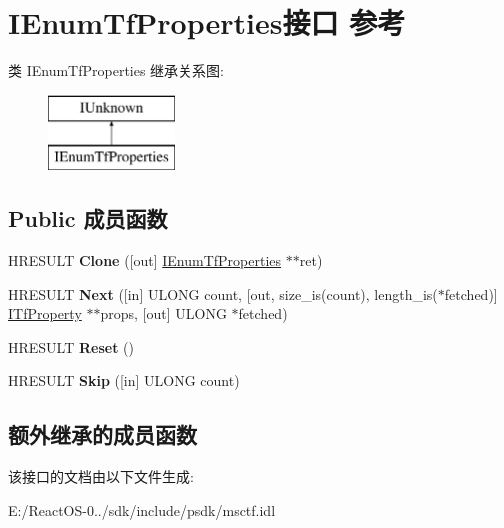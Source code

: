 \hypertarget{interface_i_enum_tf_properties}{}\section{I\+Enum\+Tf\+Properties接口 参考}
\label{interface_i_enum_tf_properties}
类 I\+Enum\+Tf\+Properties 继承关系图\+:\begin{figure}[H]
\begin{center}
\leavevmode
\includegraphics[height=2.000000cm]{interface_i_enum_tf_properties}
\end{center}
\end{figure}
\subsection*{Public 成员函数}
\begin{DoxyCompactItemize}
\item 
\mbox{\label{interface_i_enum_tf_properties_a7e46e520971ca4cfb4d2cafff56a8c39}} 
H\+R\+E\+S\+U\+LT {\bfseries Clone} (\mbox{[}out\mbox{]} \hyperlink{interface_i_enum_tf_properties}{I\+Enum\+Tf\+Properties} $\ast$$\ast$ret)
\item 
\mbox{\label{interface_i_enum_tf_properties_a3b13bc7b7958f32df6836393c3ce84ac}} 
H\+R\+E\+S\+U\+LT {\bfseries Next} (\mbox{[}in\mbox{]} U\+L\+O\+NG count, \mbox{[}out, size\+\_\+is(count), length\+\_\+is($\ast$fetched)\mbox{]} \hyperlink{interface_i_tf_property}{I\+Tf\+Property} $\ast$$\ast$props, \mbox{[}out\mbox{]} U\+L\+O\+NG $\ast$fetched)
\item 
\mbox{\label{interface_i_enum_tf_properties_ab44eb983c378885cce100ceb0c1b85c8}} 
H\+R\+E\+S\+U\+LT {\bfseries Reset} ()
\item 
\mbox{\label{interface_i_enum_tf_properties_a21383bdd823f8512108de8c9cda6d21e}} 
H\+R\+E\+S\+U\+LT {\bfseries Skip} (\mbox{[}in\mbox{]} U\+L\+O\+NG count)
\end{DoxyCompactItemize}
\subsection*{额外继承的成员函数}


该接口的文档由以下文件生成\+:\begin{DoxyCompactItemize}
\item 
E\+:/\+React\+O\+S-\/0../sdk/include/psdk/msctf.\+idl\end{DoxyCompactItemize}
